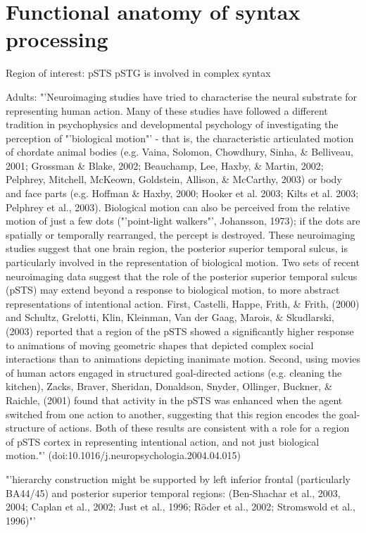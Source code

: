 \section{Functional anatomy of syntax processing}

Region of interest: pSTS
pSTG is involved in complex syntax

Adults:
"'Neuroimaging studies have tried to characterise the neural substrate for representing human action. Many of these studies have followed a different tradition in psychophysics and developmental psychology of investigating the perception of "'biological motion"' - that is, the characteristic articulated motion of chordate animal bodies (e.g. Vaina, Solomon, Chowdhury, Sinha, \& Belliveau, 2001; Grossman \& Blake, 2002; Beauchamp, Lee, Haxby, \& Martin, 2002; Pelphrey, Mitchell, McKeown, Goldstein, Allison, \& McCarthy, 2003) or body and face parts (e.g. Hoffman \& Haxby, 2000; Hooker et al. 2003; Kilts et al. 2003; Pelphrey et al., 2003). Biological motion can also be perceived from the relative motion of just a few dots ("'point-light walkers"', Johansson, 1973); if the dots are spatially or temporally rearranged, the percept is destroyed. These neuroimaging studies suggest that one brain region, the posterior superior temporal sulcus, is particularly involved in the representation of biological motion.
Two sets of recent neuroimaging data suggest that the role of the posterior superior temporal sulcus (pSTS) may extend beyond a response to biological motion, to more abstract representations of intentional action. First, Castelli, Happe, Frith, \& Frith, (2000) and Schultz, Grelotti, Klin, Kleinman, Van der Gaag, Marois, \& Skudlarski, (2003) reported that a region of the pSTS showed a significantly higher response to animations of moving geometric shapes that depicted complex social interactions than to animations depicting inanimate motion. Second, using movies of human actors engaged in structured goal-directed actions (e.g. cleaning the kitchen), Zacks, Braver, Sheridan, Donaldson, Snyder, Ollinger, Buckner, \& Raichle, (2001) found that activity in the pSTS was enhanced when the agent switched from one action to another, suggesting that this region encodes the goal-structure of actions. Both of these results are consistent with a role for a region of pSTS cortex in representing intentional action, and not just biological motion."' (doi:10.1016/j.neuropsychologia.2004.04.015)


"'hierarchy construction might be supported by left inferior frontal (particularly BA44/45) and posterior superior temporal regions: (Ben-Shachar et al., 2003, 2004; Caplan et al., 2002; Just et al., 1996; Röder et al., 2002; Stromswold et al., 1996)"'

